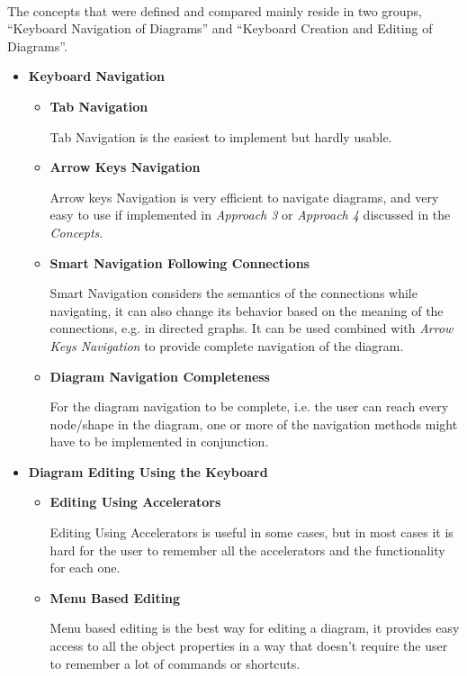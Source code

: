 \paragraph{}
The concepts that were defined and compared mainly reside in two groups, ``Keyboard Navigation of Diagrams'' and ``Keyboard Creation and Editing of Diagrams''.

\begin{itemize}
\item {\bf Keyboard Navigation}

\begin{itemize}
	\item {\bf Tab Navigation}
	\par \noindent
	Tab Navigation is the easiest to implement but hardly usable.

	\item {\bf Arrow Keys Navigation}
	\par \noindent
	Arrow keys Navigation is very efficient to navigate diagrams, and very easy to use if implemented in {\em Approach 3} or {\em Approach 4} discussed in the {\em Concepts}.

	\item {\bf Smart Navigation Following Connections}
	\par \noindent
	Smart Navigation considers the semantics of the connections while navigating, it can also change its behavior based on the meaning of the connections, e.g. in directed graphs. It can be used combined with {\em Arrow Keys Navigation} to provide complete navigation of the diagram.

	\item {\bf Diagram Navigation Completeness}
	\par \noindent
	For the diagram navigation to be complete, i.e. the user can reach every node/shape in the diagram, one or more of the navigation methods might have to be implemented in conjunction.
\end{itemize}

\item {\bf Diagram Editing Using the Keyboard}
\begin{itemize}
	\item {\bf Editing Using Accelerators} 
	\par \noindent
	Editing Using Accelerators is useful in some cases, but in most cases it is hard for the user to remember all the accelerators and the functionality for each one.
	
	\item {\bf Menu Based Editing}
	\par \noindent
	Menu based editing is the best way for editing a diagram, it provides easy access to all the object properties in a way that doesn't require the user to remember a lot of commands or shortcuts.
	

\end{itemize}
\end{itemize}
